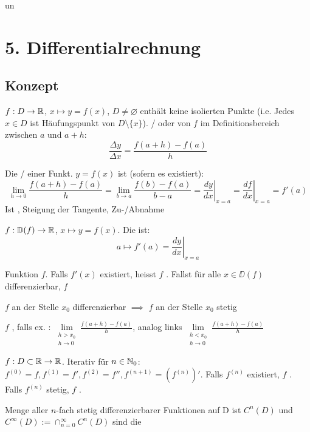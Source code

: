 un\section{5. Differentialrechnung}

\subsection{Konzept}

\Def $f: D \to \mathbb{R}$, $x \mapsto y = f(x)$, $D \neq \varnothing$ enthält keine
isolierten Punkte (i.e. Jedes $x \in D$ ist Häufungspunkt von $D \setminus \{x\}$).
/ oder 
von $f$ im Definitionsbereich zwischen $a$ und $a+h$:
$$\frac{\Delta y}{\Delta x} = \frac{f(a+h) - f(a)}{h}$$

\Def Die / einer Funkt. $y = f(x)$ 
ist (sofern es existiert):
$$\lim\limits_{h\to 0} \frac{f(a+h)-f(a)}{h} = \lim\limits_{b\to a}\frac{f(b) - f(a)}{b - a} = \left.\frac{dy}{dx}\right|_{x=a} = \left.\frac{df}{dx}\right|_{x=a} = f'(a)$$
Ist , Steigung der Tangente,  Zu-/Abnahme

\Def $f: \mathbb{D}(f) \to \mathbb{R}$, $x \mapsto y = f(x)$. Die  ist:
$$a \mapsto f'(a) = \left. \frac{dy}{dx} \right|_{x=a}$$

\Def Funktion $f$. Falls $f'(x)$ existiert, heisst $f$ .
Fallst für alle $x \in \DD(f)$ differenzierbar, $f$ 

\Satz $f$ an der Stelle $x_0$ differenzierbar $\implies$ $f$ an der Stelle $x_0$ stetig

\Def $f$ , falls ex. :
$\lim\limits_{\substack{h > x_0 \\ h \to 0}}\frac{f(a+h) - f(a)}{h}$, analog links
$\lim\limits_{\substack{h < x_0 \\ h \to 0}}\frac{f(a+h) - f(a)}{h}$

\Def $f: D \subset \mathbb{R} \to \mathbb{R}$. Iterativ  für $n \in \mathbb{N}_0$:
$f^{(0)} = f, f^{(1)} = f', f^{(2)} = f'', f^{(n+1)} = (f^{(n)})'$.
Falls $f^{(n)}$ existiert, $f$ . Falls $f^{(n)}$ stetig,
$f$ .

\Def Menge aller $n$-fach stetig differenzierbarer Funktionen auf D ist $C^n(D)$ und
$C^\infty(D) := \cap_{n=0}^\infty C^n(D)$ sind die 

